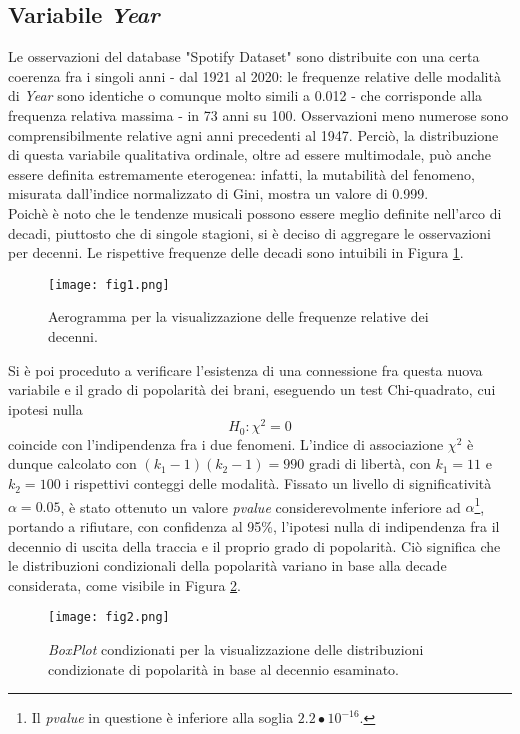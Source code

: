 \documentclass[fleqn,10pt]{SelfArx} %
\begin{document}
\subsection*{Variabile \textit{Year}}\label{year}
Le osservazioni del database "Spotify Dataset" sono distribuite con una certa coerenza fra i singoli anni - dal 1921 al 2020: le frequenze relative delle modalità di \textit{Year} sono identiche o comunque molto simili a 0.012 - che corrisponde alla frequenza relativa massima - in 73 anni su 100. Osservazioni meno numerose sono comprensibilmente relative agni anni precedenti al 1947. Perciò, la distribuzione di questa variabile qualitativa ordinale, oltre ad essere multimodale, può anche essere definita estremamente eterogenea: infatti, la mutabilità del fenomeno, misurata dall'indice normalizzato di Gini, mostra un valore di 0.999.\\
Poichè è noto che le tendenze musicali possono essere meglio definite nell'arco di decadi, piuttosto che di singole stagioni, si è deciso di aggregare le osservazioni per decenni. Le rispettive frequenze delle decadi sono intuibili in Figura \ref{fig:fig1}. 
\begin{figure}[H]
    \centering
    \texttt{[image: fig1.png]}
    \label{fig:fig1}
    \caption{Aerogramma per la visualizzazione delle frequenze relative dei decenni.}
\end{figure}
Si è poi proceduto a verificare l'esistenza di una connessione fra questa nuova variabile e il grado di popolarità dei brani, eseguendo un test Chi-quadrato, cui ipotesi nulla
\begin{equation}
  H_0:\chi^2=0  
\end{equation}
coincide con l'indipendenza fra i due fenomeni. L'indice di associazione $\chi^2$ è dunque calcolato con $(k_1-1)(k_2-1)=990$ gradi di libertà, con $k_1=11$ e $k_2=100$ i rispettivi conteggi delle modalità. Fissato un livello di significatività $\alpha=0.05$, è stato ottenuto un valore \textit{pvalue} considerevolmente inferiore ad $\alpha$\footnote{Il \textit{pvalue} in questione è inferiore alla soglia $2.2\bullet10^{-16}$.}, portando a rifiutare, con confidenza al 95\%, l'ipotesi nulla di indipendenza fra il decennio di uscita della traccia e il proprio grado di popolarità. Ciò significa che le distribuzioni condizionali della popolarità variano in base alla decade considerata, come visibile in Figura \ref{fig:fig2}. 
\begin{figure}[H]
    \centering
    \texttt{[image: fig2.png]}
    \label{fig:fig2}
    \caption{\textit{BoxPlot} condizionati per la visualizzazione delle distribuzioni condizionate di popolarità in base al decennio esaminato.}
\end{figure}
\end{document}
